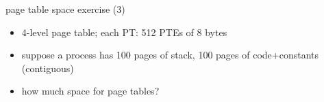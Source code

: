 \begin{frame}{page table space exercise (3)}
\begin{itemize}
\item 4-level page table; each PT: 512 PTEs of 8 bytes
\item suppose a process has 100 pages of stack, 100 pages of code+constants (contiguous)
\item how much space for page tables? 
\iftoggle{heldback}{}{
    \item<2-> 1 shared first-level PT, with four valid entries
    \item<2-> four second-level PT, each with one valid entry
        \begin{itemize}\item two for stack, two for code+constants\end{itemize}
    \item<2-> four third-level PT, each with one valid entry
    \item<2-> four fourth-level PT, each with 50 valid entries
}
\end{itemize}
\end{frame}

